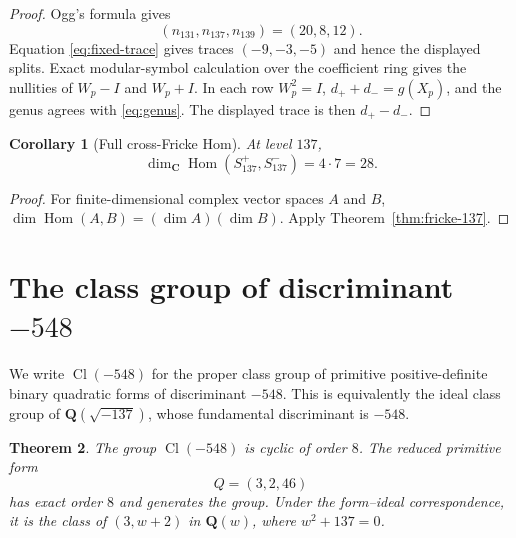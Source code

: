 \documentclass[11pt]{article}
\newtheorem{theorem}{Theorem}[section]
\newtheorem{corollary}[theorem]{Corollary}
\theoremstyle{definition}
\theoremstyle{remark}
\newcommand{\C}{\mathbf{C}}
\newcommand{\Q}{\mathbf{Q}}
\DeclareMathOperator{\Hom}{Hom}
\DeclareMathOperator{\Cl}{Cl}
\begin{document}
\begin{proof}
Ogg's formula gives
\[
  (n_{131},n_{137},n_{139})=(20,8,12).
\]
Equation \eqref{eq:fixed-trace} gives traces
$(-9,-3,-5)$ and hence the displayed splits.  Exact modular-symbol
calculation over the coefficient ring gives the nullities of $W_p-I$ and
$W_p+I$.  In each row $W_p^2=I$, $d_++d_-=g(X_p)$, and the genus agrees with
\eqref{eq:genus}.  The displayed trace is then $d_+-d_-$.
\end{proof}

\begin{corollary}[Full cross-Fricke Hom]\label{cor:full-hom-28}
At level $137$,
\[
  \dim_{\C}\Hom(S_{137}^+,S_{137}^-)=4\cdot 7=28.
\]
\end{corollary}

\begin{proof}
For finite-dimensional complex vector spaces $A$ and $B$,
$\dim\Hom(A,B)=(\dim A)(\dim B)$.  Apply Theorem~\ref{thm:fricke-137}.
\end{proof}

\section{The class group of discriminant \texorpdfstring{$-548$}{-548}}

We write $\Cl(-548)$ for the proper class group of primitive positive-definite
binary quadratic forms of discriminant $-548$.  This is equivalently the ideal
class group of $\Q(\sqrt{-137})$, whose fundamental discriminant is $-548$.

\begin{theorem}\label{thm:class-group-minus-548}
The group $\Cl(-548)$ is cyclic of order $8$.  The reduced primitive form
\[
  Q=(3,2,46)
\]
has exact order $8$ and generates the group.  Under the form--ideal
correspondence, it is the class of $(3,w+2)$ in
$\Q(w)$, where $w^2+137=0$.
\end{theorem}
\end{document}
